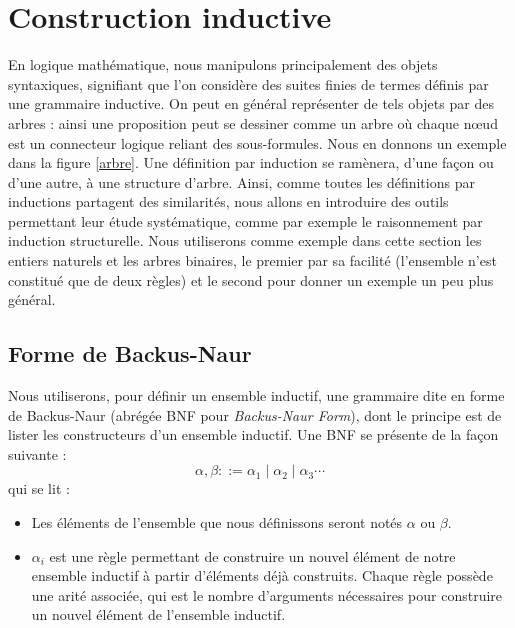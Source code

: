 \section{Construction inductive}

En logique mathématique, nous manipulons principalement des objets syntaxiques, signifiant que l'on considère des suites finies de termes définis par une grammaire inductive. On peut en général représenter de tels objets par des arbres : ainsi une proposition peut se dessiner comme un arbre où chaque nœud est un connecteur logique reliant des sous-formules. Nous en donnons un exemple dans la figure \ref{arbre}. Une définition par induction se ramènera, d'une façon ou d'une autre, à une structure d'arbre. Ainsi, comme toutes les définitions par inductions partagent des similarités, nous allons en introduire des outils permettant leur étude systématique, comme par exemple le raisonnement par induction structurelle. Nous utiliserons comme exemple dans cette section les entiers naturels et les arbres binaires, le premier par sa facilité (l'ensemble n'est constitué que de deux règles) et le second pour donner un exemple un peu plus général.

\label{arbre}

\subsection{Forme de Backus-Naur}

Nous utiliserons, pour définir un ensemble inductif, une grammaire dite en forme de Backus-Naur (abrégée BNF pour \textit{Backus-Naur Form}), dont le principe est de lister les constructeurs d'un ensemble inductif. Une BNF se présente de la façon suivante : $$ \alpha,\beta ::= \alpha_1\mid\alpha_2\mid\alpha_3\cdots$$ qui se lit :

\begin{itemize}[label=$\bullet$]
    \item Les éléments de l'ensemble que nous définissons seront notés $\alpha$ ou $\beta$.
    \item $\alpha_i$ est une règle permettant de construire un nouvel élément de notre ensemble inductif à partir d'éléments déjà construits. Chaque règle possède une arité associée, qui est le nombre d'arguments nécessaires pour construire un nouvel élément de l'ensemble inductif.
\end{itemize}


